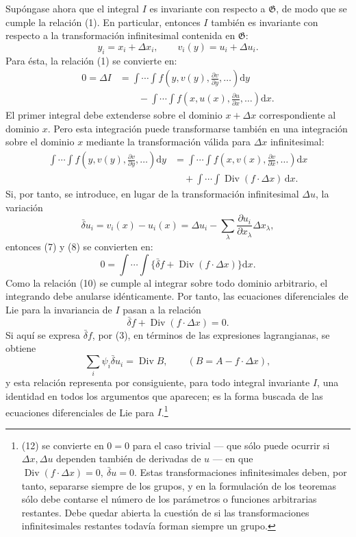 \documentclass[11pt]{article}
\newcommand{\D}{\Delta}
\providecommand{\dd}{\mathrm d}
\providecommand{\Div}{\operatorname{Div}}
\providecommand{\G}{\mathfrak G}
\providecommand{\bd}{\bar{\delta}}
\providecommand{\p}{\partial}
\begin{document}
Supóngase ahora que el integral \(I\) es invariante con respecto a \(\G\), de modo que se cumple la relación (1). En particular, entonces \(I\) también es invariante con respecto a la transformación infinitesimal contenida en \(\G\):
\[
y_i=x_i+\D x_i,\qquad v_i(y)=u_i+\D u_i.
\]
Para ésta, la relación (1) se convierte en:
\begin{equation}
\begin{aligned}
0=\D I
&=\int\!\cdots\!\int f\!\left(y,v(y),\frac{\p v}{\p y},\ldots\right)\dd y\\
&\qquad-\int\!\cdots\!\int f\!\left(x,u(x),\frac{\p u}{\p x},\ldots\right)\dd x.
\end{aligned}
\tag{7}
\end{equation}
El primer integral debe extenderse sobre el dominio \(x+\D x\) correspondiente al dominio \(x\). Pero esta integración puede transformarse también en una integración sobre el dominio \(x\) mediante la transformación válida para \(\D x\) infinitesimal:
\begin{equation}
\begin{aligned}
\int\!\cdots\!\int f\!\left(y,v(y),\frac{\p v}{\p y},\ldots\right)\dd y
&=\int\!\cdots\!\int f\!\left(x,v(x),\frac{\p v}{\p x},\ldots\right)\dd x\\
&\quad+\int\!\cdots\!\int \Div(f\cdot \D x)\,\dd x.
\end{aligned}
\tag{8}
\end{equation}
Si, por tanto, se introduce, en lugar de la transformación infinitesimal \(\D u\), la variación
\begin{equation}
\bd u_i=v_i(x)-u_i(x)=\D u_i-\sum_\lambda\frac{\p u_i}{\p x_\lambda}\D x_\lambda,
\tag{9}
\end{equation}
entonces (7) y (8) se convierten en:
\begin{equation}
0=\int\!\cdots\!\int\{\bd f+\Div(f\cdot\D x)\}\dd x.
\tag{10}
\end{equation}
Como la relación (10) se cumple al integrar sobre todo dominio arbitrario, el integrando debe anularse idénticamente. Por tanto, las ecuaciones diferenciales de Lie para la invariancia de \(I\) pasan a la relación
\begin{equation}
\bd f+\Div(f\cdot\D x)=0.
\tag{11}
\end{equation}
Si aquí se expresa \(\bd f\), por (3), en términos de las expresiones lagrangianas, se obtiene
\begin{equation}
\sum_i\psi_i\bd u_i=\Div B,\qquad (B=A-f\cdot\D x),
\tag{12}
\end{equation}
y esta relación representa por consiguiente, para todo integral invariante \(I\), una identidad en todos los argumentos que aparecen; es la forma buscada de las ecuaciones diferenciales de Lie para \(I\).\footnote{(12) se convierte en \(0=0\) para el caso trivial --- que sólo puede ocurrir si \(\D x,\D u\) dependen también de derivadas de \(u\) --- en que \(\Div(f\cdot\D x)=0,\ \bd u=0\). Estas transformaciones infinitesimales deben, por tanto, separarse siempre de los grupos, y en la formulación de los teoremas sólo debe contarse el número de los parámetros o funciones arbitrarias restantes. Debe quedar abierta la cuestión de si las transformaciones infinitesimales restantes todavía forman siempre un grupo.}
\end{document}
